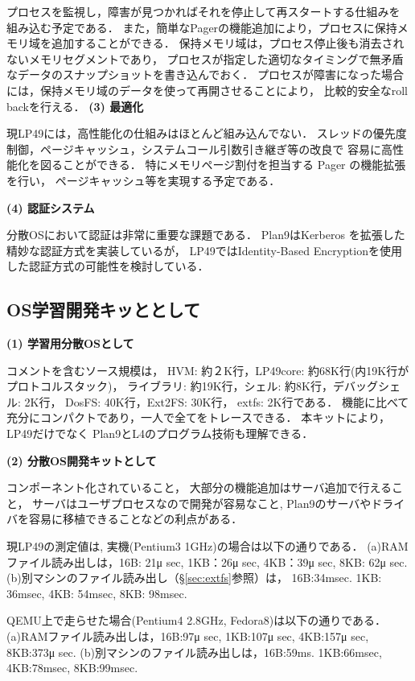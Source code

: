 \documentclass{ieicej}
\begin{document}
プロセスを監視し，障害が見つかればそれを停止して再スタートする仕組みを
組み込む予定である．
また，簡単なPagerの機能追加により，プロセスに保持メモリ域を追加することができる．
保持メモリ域は，プロセス停止後も消去されないメモリセグメントであり，
プロセスが指定した適切なタイミングで無矛盾なデータのスナップショットを書き込んでおく．
プロセスが障害になった場合には，保持メモリ域のデータを使って再開させることにより，
比較的安全なroll backを行える．
%
{\bf\flushleft (3) 最適化}
 
現LP49には，高性能化の仕組みはほとんど組み込んでない．
スレッドの優先度制御，ページキャッシュ，システムコール引数引き継ぎ等の改良で
容易に高性能化を図ることができる．
特にメモリページ割付を担当する Pager の機能拡張を行い，
ページキャッシュ等を実現する予定である．


{\bf\flushleft (4) 認証システム}

分散OSにおいて認証は非常に重要な課題である．
Plan9はKerberos を拡張した精妙な認証方式を実装しているが，
LP49ではIdentity-Based Encryption\cite{IBE}を使用した認証方式の可能性を検討している．


\subsection{OS学習開発キッととして}

{\bf (1) 学習用分散OSとして}

  コメントを含むソース規模は，  
  HVM: 約２K行，LP49core: 約68K行(内19K行がプロトコルスタック)，
  ライブラリ: 約19K行，シェル: 約8K行，デバッグシェル: 2K行，
  DosFS: 40K行，Ext2FS: 30K行， extfs: 2K行である．
機能に比べて充分にコンパクトであり，一人で全てをトレースできる．
本キットにより，LP49だけでなく Plan9とL4のプログラム技術も理解できる．


{\bf (2) 分散OS開発キットとして}

コンポーネント化されていること，
大部分の機能追加はサーバ追加で行えること，
サーバはユーザプロセスなので開発が容易なこと,
Plan9のサーバやドライバを容易に移植できることなどの利点がある．

現LP49の測定値は, 実機(Pentium3 1GHz)の場合は以下の通りである．
(a)RAMファイル読み出しは，16B: 21μ sec, 1KB：26μ sec, 4KB：39μ sec, 8KB: 62μ sec.
(b)別マシンのファイル読み出し（\S \ref{sec:extfs}参照）は，
16B:34msec. 1KB: 36msec, 4KB: 54msec, 8KB: 98msec.

QEMU上で走らせた場合(Pentium4 2.8GHz, Fedora8)は以下の通りである．
(a)RAMファイル読み出しは，16B:97μ sec, 1KB:107μ sec, 4KB:157μ sec, 8KB:373μ sec.
(b)別マシンのファイル読み出しは，16B:59ms. 1KB:66msec, 4KB:78msec, 8KB:99msec.
\end{document}

